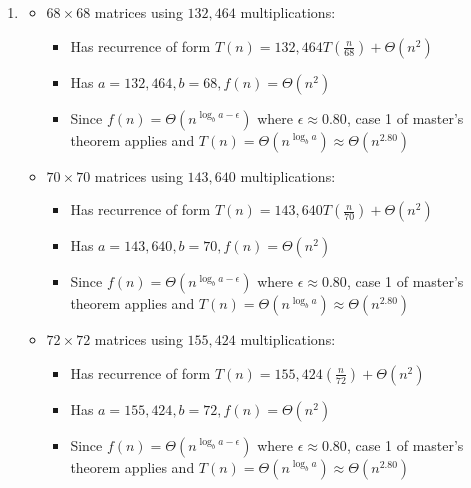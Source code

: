 \documentclass[12pt]{article}
\begin{document}
\begin{enumerate}[1.]
    \item

    \begin{itemize}
        \item $68 \times 68$ matrices using $132,464$ multiplications:

        \begin{itemize}
            \item Has recurrence of form $T(n) = 132,464T(\frac{n}{68}) + \Theta(n^2)$
            \item Has $a = 132,464, b = 68, f(n) = \Theta(n^2)$
            \item Since $f(n) = \Theta(n^{\log_b a - \epsilon})$ where $\epsilon \approx 0.80$, case 1
            of master's theorem applies and $T(n) = \Theta(n^{\log_b a}) \approx \Theta(n^{2.80})$
        \end{itemize}

        \item $70 \times 70$ matrices using $143,640$ multiplications:

        \begin{itemize}
            \item Has recurrence of form $T(n) = 143,640T(\frac{n}{70}) + \Theta(n^2)$
            \item Has $a = 143,640, b = 70, f(n) = \Theta(n^2)$
            \item Since $f(n) = \Theta(n^{\log_b a - \epsilon})$ where $\epsilon \approx 0.80$, case 1
            of master's theorem applies and $T(n) = \Theta(n^{\log_b a}) \approx \Theta(n^{2.80})$
        \end{itemize}

        \item $72 \times 72$ matrices using $155,424$ multiplications:

        \begin{itemize}
            \item Has recurrence of form $T(n) = 155,424(\frac{n}{72}) + \Theta(n^2)$
            \item Has $a = 155,424, b = 72, f(n) = \Theta(n^2)$
            \item Since $f(n) = \Theta(n^{\log_b a - \epsilon})$ where $\epsilon \approx 0.80$, case 1
            of master's theorem applies and $T(n) = \Theta(n^{\log_b a}) \approx \Theta(n^{2.80})$
        \end{itemize}
    \end{itemize}

    \bigskip


\end{enumerate}
\end{document}
